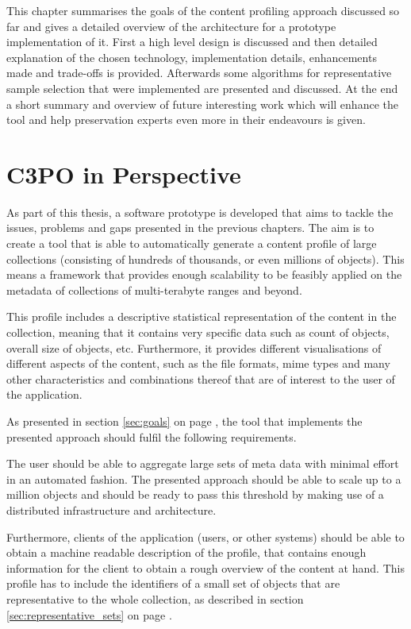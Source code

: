 This chapter summarises the goals of the content profiling approach discussed so far and gives a detailed overview of the architecture for a prototype implementation of it. First a high level design is discussed and then detailed explanation of the chosen technology, implementation details, enhancements made and trade-offs is provided. Afterwards some algorithms for representative sample selection that were implemented are presented and discussed. At the end a short summary and overview of future interesting work which will enhance the tool and help preservation experts even more in their endeavours is given.

\section{C3PO in Perspective}
As part of this thesis, a software prototype is developed that aims to tackle the issues, problems and gaps presented in the previous chapters. The aim is to create a tool that is able to automatically generate a content profile of large collections (consisting of hundreds of thousands, or even millions of objects). This means a framework that provides enough scalability to be feasibly applied on the metadata of collections of multi-terabyte ranges and beyond.

This profile includes a descriptive statistical representation of the content in the collection, meaning that it contains very specific data such as count of objects, overall size of objects, etc. Furthermore, it provides different visualisations of different aspects of the content, such as the file formats, mime types and many other characteristics and combinations thereof that are of interest to the user of the application.

As presented in section \ref{sec:goals} on page \pageref{sec:goals}, the tool that implements the presented approach should fulfil the following requirements.

The user should be able to aggregate large sets of meta data with minimal effort in an automated fashion. The presented approach should be able to scale up to a million objects and should be ready to pass this threshold by making use of a distributed infrastructure and architecture.

Furthermore, clients of the application (users, or other systems) should be able to obtain a machine readable description of the profile, that contains enough information for the client to obtain a rough overview of the content at hand. This profile has to include the identifiers of a small set of objects that are representative to the whole collection, as described in section \ref{sec:representative_sets} on page \pageref{sec:representative_sets}.

